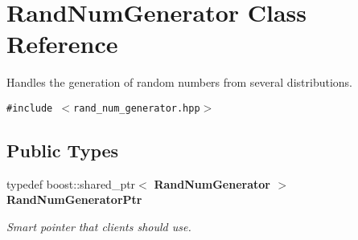 \section{Rand\-Num\-Generator Class Reference}
\label{classRandNumGenerator}
Handles the generation of random numbers from several distributions.  


{\tt \#include $<$rand\_\-num\_\-generator.hpp$>$}

\subsection*{Public Types}
\begin{CompactItemize}
\item 
typedef boost::shared\_\-ptr$<$ \bf{Rand\-Num\-Generator} $>$ \bf{Rand\-Num\-Generator\-Ptr}\label{classRandNumGenerator_6a66f8e312a44856f47f655d7cae85ea}

\begin{CompactList}\small\item\em Smart pointer that clients should use. \item\end{CompactList}\end{CompactItemize}
